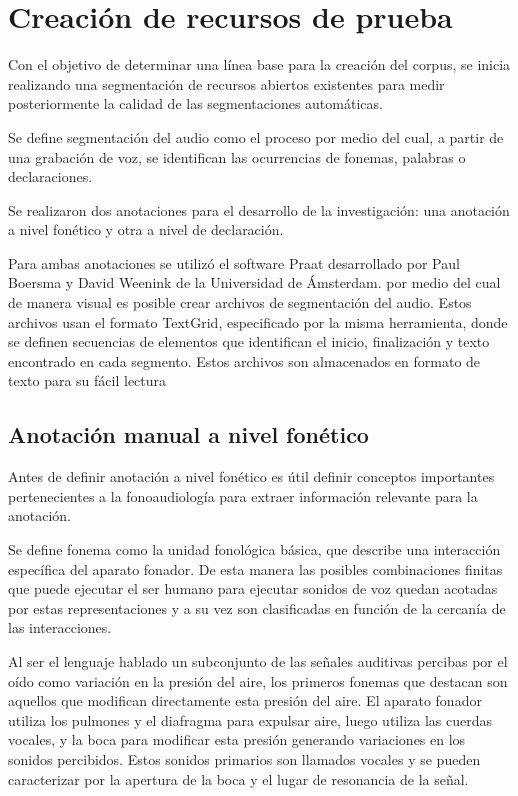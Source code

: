 \chapter{Creación de recursos de prueba}

Con el objetivo de determinar una línea base para la creación del corpus, se inicia realizando una segmentación de recursos abiertos existentes para medir posteriormente la calidad de las segmentaciones automáticas.

Se define segmentación del audio como el proceso por medio del cual, a partir de una grabación de voz, se identifican las ocurrencias de fonemas, palabras o declaraciones. 

Se realizaron dos anotaciones para el desarrollo de la investigación: una anotación a nivel fonético y otra a nivel de declaración.

Para ambas anotaciones se utilizó el software Praat \cite{Praat} desarrollado por Paul Boersma y David Weenink de la Universidad de Ámsterdam. por medio del cual de manera visual es posible crear archivos de segmentación del audio. Estos archivos usan el formato TextGrid, especificado por la misma herramienta, donde se definen secuencias de elementos que identifican el inicio, finalización y texto encontrado en cada segmento. Estos archivos son almacenados en formato de texto para su fácil lectura \cite{TextGrids}

\section{Anotación manual a nivel fonético}

Antes de definir anotación a nivel fonético es útil definir conceptos importantes pertenecientes a la fonoaudiología para extraer información relevante para la anotación.

Se define fonema como la unidad fonológica básica, que describe una interacción específica del aparato fonador. De esta manera las posibles combinaciones finitas que puede ejecutar el ser humano para ejecutar sonidos de voz quedan acotadas por estas representaciones y a su vez son clasificadas en función de la cercanía de las interacciones.

Al ser el lenguaje hablado un subconjunto de las señales auditivas percibas por el oído como variación en la presión del aire, los primeros fonemas que destacan son aquellos que modifican directamente esta presión del aire. El aparato fonador utiliza los pulmones y el diafragma para expulsar aire, luego utiliza las cuerdas vocales, y la boca para modificar esta presión generando variaciones en los sonidos percibidos. Estos sonidos primarios son llamados vocales y se pueden caracterizar por la apertura de la boca y el lugar de resonancia de la señal.

